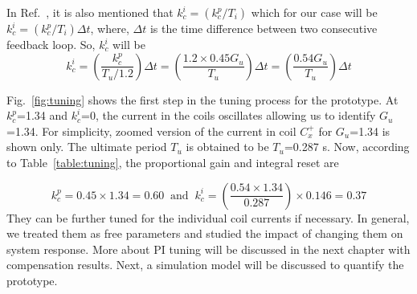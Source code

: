 \FloatBarrier
In Ref.~\cite{tuning_formula}, it is also mentioned that $k_c^i=(k_c^p/T_i)$ which for our case will be $k_c^i=(k_c^p/T_i)\Delta t$, where, $\Delta t$ is the time difference between two consecutive feedback loop. So, $k_c^i$ will be
\begin{equation}
    k_c^i=\left(\frac{k_c^p}{T_u/1.2}\right)\Delta t=\left(\frac{1.2\times0.45 G_u}{T_u}\right)\Delta t=\left(\frac{0.54 G_u}{T_u}\right)\Delta t
\end{equation}

\FloatBarrier
Fig.~\ref{fig:tuning} shows the first step in the tuning process for the prototype. At $k_c^p$=1.34 and $k_c^i$=0, the current in the coils oscillates allowing us to identify $G_u$=1.34. For simplicity, zoomed version of the current in coil $C_x^+$ for $G_u$=1.34 is shown only. The ultimate period $T_u$ is obtained to be $T_u$=0.287 s. Now, according to Table~\ref{table:tuning}, the proportional gain and integral reset are

\begin{equation}
    k_c^p=0.45\times1.34=0.60\;\;\text{and}\;\; k_c^i=\left(\frac{0.54 \times1.34}{0.287}\right)\times0.146=0.37
\end{equation}
They can be further tuned for the individual coil currents if necessary. In general, we treated them as free parameters and studied the impact of changing them on system response. More about PI tuning will be discussed in the next chapter with compensation results. Next, a simulation model will be discussed to quantify the prototype.






